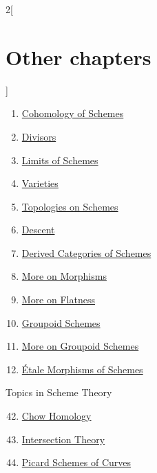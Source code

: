 \begin{multicols}{2}[\section{Other chapters}]
\begin{enumerate}
\item \href{https://github.com/stacks/stacks-project/blob/a04446e57ec1fbc252a871afcec7752fb2807b14/coherent.tex}{Cohomology of Schemes}
\item \href{https://github.com/stacks/stacks-project/blob/a04446e57ec1fbc252a871afcec7752fb2807b14/divisors.tex}{Divisors}
\item \href{https://github.com/stacks/stacks-project/blob/a04446e57ec1fbc252a871afcec7752fb2807b14/limits.tex}{Limits of Schemes}
\item \href{https://github.com/stacks/stacks-project/blob/a04446e57ec1fbc252a871afcec7752fb2807b14/varieties.tex}{Varieties}
\item \href{https://github.com/stacks/stacks-project/blob/a04446e57ec1fbc252a871afcec7752fb2807b14/topologies.tex}{Topologies on Schemes}
\item \href{https://github.com/stacks/stacks-project/blob/a04446e57ec1fbc252a871afcec7752fb2807b14/descent.tex}{Descent}
\item \href{https://github.com/stacks/stacks-project/blob/a04446e57ec1fbc252a871afcec7752fb2807b14/perfect.tex}{Derived Categories of Schemes}
\item \href{https://github.com/stacks/stacks-project/blob/a04446e57ec1fbc252a871afcec7752fb2807b14/more-morphisms.tex}{More on Morphisms}
\item \href{https://github.com/stacks/stacks-project/blob/a04446e57ec1fbc252a871afcec7752fb2807b14/flat.tex}{More on Flatness}
\item \href{https://github.com/stacks/stacks-project/blob/a04446e57ec1fbc252a871afcec7752fb2807b14/groupoids.tex}{Groupoid Schemes}
\item \href{https://github.com/stacks/stacks-project/blob/a04446e57ec1fbc252a871afcec7752fb2807b14/more-groupoids.tex}{More on Groupoid Schemes}
\item \href{https://github.com/stacks/stacks-project/blob/a04446e57ec1fbc252a871afcec7752fb2807b14/etale.tex}{\'Etale Morphisms of Schemes}
\end{enumerate}
Topics in Scheme Theory
\begin{enumerate}
\setcounter{enumi}{41}
\item \href{https://github.com/stacks/stacks-project/blob/a04446e57ec1fbc252a871afcec7752fb2807b14/chow.tex}{Chow Homology}
\item \href{https://github.com/stacks/stacks-project/blob/a04446e57ec1fbc252a871afcec7752fb2807b14/intersection.tex}{Intersection Theory}
\item \href{https://github.com/stacks/stacks-project/blob/a04446e57ec1fbc252a871afcec7752fb2807b14/pic.tex}{Picard Schemes of Curves}

\end{enumerate}
\end{multicols}
